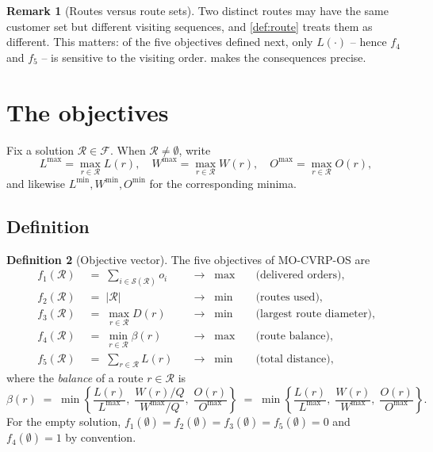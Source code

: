 \documentclass[11pt,a4paper]{article}
\theoremstyle{definition}
\newtheorem{definition}{Definition}[section]
\newtheorem{remark}[definition]{Remark}
\theoremstyle{plain}
\newcommand{\Feas}{\mathcal{F}}
\newcommand{\Routes}{\mathcal{R}}
\newcommand{\Ground}{\mathcal{S}}
\newcommand{\Lmax}{L^{\max}}
\newcommand{\Wmax}{W^{\max}}
\newcommand{\Omax}{O^{\max}}
\begin{document}
\begin{remark}[Routes versus route sets]
\label{rem:seq}
Two distinct routes may have the same customer set but different visiting
sequences, and \cref{def:route} treats them as different.  This matters: of the
five objectives defined next, only $L(\cdot)$ -- hence $f_4$ and $f_5$ -- is
sensitive to the visiting order.   makes the consequences
precise.
\end{remark}

\section{The objectives}
\label{sec:objectives}

Fix a solution $\Routes \in \Feas$.  When $\Routes \ne \emptyset$, write
\begin{equation}
  \Lmax = \max_{r \in \Routes} L(r), \quad
  \Wmax = \max_{r \in \Routes} W(r), \quad
  \Omax = \max_{r \in \Routes} O(r),
  \label{eq:maxima}
\end{equation}
and likewise $L^{\min}, W^{\min}, O^{\min}$ for the corresponding minima.

\subsection{Definition}

\begin{definition}[Objective vector]
\label{def:objectives}
The five objectives of \textup{\textsc{MO-CVRP-OS}} are
\begin{align}
  f_1(\Routes) &\;=\; \sum_{i \in \Ground(\Routes)} o_i
    &&\longrightarrow\; \max
    &&\text{(delivered orders)},
  \label{eq:f1}\\[2pt]
  f_2(\Routes) &\;=\; |\Routes|
    &&\longrightarrow\; \min
    &&\text{(routes used)},
  \label{eq:f2}\\[2pt]
  f_3(\Routes) &\;=\; \max_{r \in \Routes} D(r)
    &&\longrightarrow\; \min
    &&\text{(largest route diameter)},
  \label{eq:f3}\\[2pt]
  f_4(\Routes) &\;=\; \min_{r \in \Routes} \beta(r)
    &&\longrightarrow\; \max
    &&\text{(route balance)},
  \label{eq:f4}\\[2pt]
  f_5(\Routes) &\;=\; \sum_{r \in \Routes} L(r)
    &&\longrightarrow\; \min
    &&\text{(total distance)},
  \label{eq:f5}
\end{align}
where the \emph{balance} of a route $r \in \Routes$ is
\begin{equation}
  \beta(r) \;=\; \min\left\{
    \frac{L(r)}{\Lmax}, \;
    \frac{W(r)/Q}{\Wmax/Q}, \;
    \frac{O(r)}{\Omax}
  \right\}
  \;=\;
  \min\left\{
    \frac{L(r)}{\Lmax}, \;
    \frac{W(r)}{\Wmax}, \;
    \frac{O(r)}{\Omax}
  \right\}.
  \label{eq:beta}
\end{equation}
For the empty solution, $f_1(\emptyset) = f_2(\emptyset) = f_3(\emptyset) =
f_5(\emptyset) = 0$ and $f_4(\emptyset) = 1$ by convention.
\end{definition}
\end{document}
